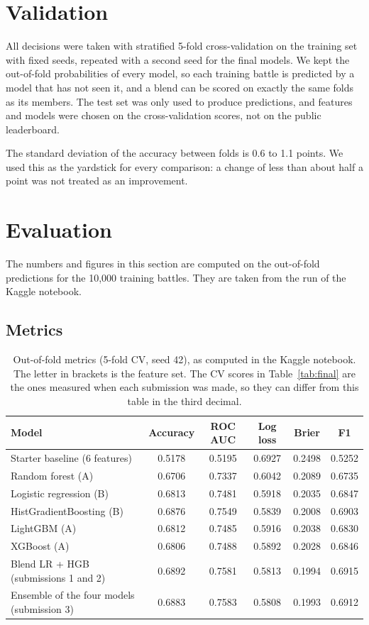 \documentclass[11pt,a4paper]{article}
\begin{document}
\section{Validation}

All decisions were taken with stratified 5-fold cross-validation on the training set with fixed
seeds, repeated with a second seed for the final models. We kept the out-of-fold probabilities of
every model, so each training battle is predicted by a model that has not seen it, and a blend can
be scored on exactly the same folds as its members. The test set was only used to produce
predictions, and features and models were chosen on the cross-validation scores, not on the public
leaderboard.

The standard deviation of the accuracy between folds is 0.6 to 1.1 points. We used this as the
yardstick for every comparison: a change of less than about half a point was not treated as an
improvement.

\section{Evaluation}
\label{sec:evaluation}

The numbers and figures in this section are computed on the out-of-fold predictions for the
10,000 training battles. They are taken from the run of the Kaggle notebook.

\subsection{Metrics}

\begin{table}[H]
\centering\small
\begin{tabular}{@{}lccccc@{}}
\toprule
Model & Accuracy & ROC AUC & Log loss & Brier & F1 \\
\midrule
Starter baseline (6 features) & 0.5178 & 0.5195 & 0.6927 & 0.2498 & 0.5252 \\
Random forest (A) & 0.6706 & 0.7337 & 0.6042 & 0.2089 & 0.6735 \\
\midrule
Logistic regression (B) & 0.6813 & 0.7481 & 0.5918 & 0.2035 & 0.6847 \\
HistGradientBoosting (B) & 0.6876 & 0.7549 & 0.5839 & 0.2008 & 0.6903 \\
LightGBM (A) & 0.6812 & 0.7485 & 0.5916 & 0.2038 & 0.6830 \\
XGBoost (A) & 0.6806 & 0.7488 & 0.5892 & 0.2028 & 0.6846 \\
\midrule
Blend LR + HGB (submissions 1 and 2) & 0.6892 & 0.7581 & 0.5813 & 0.1994 & 0.6915 \\
Ensemble of the four models (submission 3) & 0.6883 & 0.7583 & 0.5808 & 0.1993 & 0.6912 \\
\bottomrule
\end{tabular}
\caption{Out-of-fold metrics (5-fold CV, seed 42), as computed in the Kaggle notebook. The letter
in brackets is the feature set. The CV scores in Table~\ref{tab:final} are the ones measured when
each submission was made, so they can differ from this table in the third decimal.}
\label{tab:metrics}
\end{table}
\end{document}
